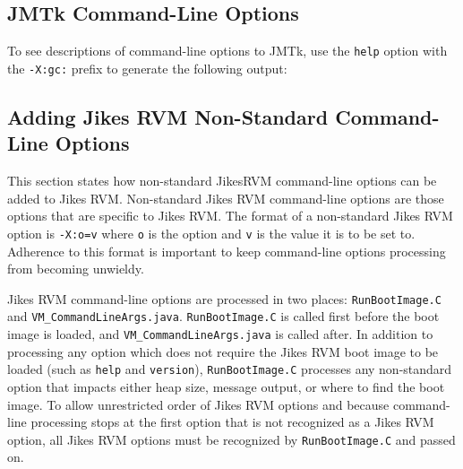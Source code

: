 \subsection{JMTk Command-Line Options}
\label{section:jmtkoptions}

To see descriptions of command-line options to JMTk,
use the {\tt help} option with the {\tt -X:gc:} prefix 
to generate the following output:

\T \begin{tiny}

\T \end{tiny}

\subsection{Adding Jikes RVM Non-Standard Command-Line Options}
This section states how non-standard Jikes\trademark RVM command-line
options can be added to Jikes RVM.  Non-standard Jikes RVM
command-line options are those options that are specific to Jikes RVM.
The format of a non-standard Jikes RVM option is {\tt -X:o=v} where
{\tt o} is the option and {\tt v} is the value it is to be set to.
Adherence to this format is important to keep command-line options
processing from becoming unwieldy.

Jikes RVM command-line options are processed in two places: 
{\tt RunBootImage.C} and {\tt VM\_CommandLineArgs.java}.  
{\tt RunBootImage.C} is called first before the boot image is loaded, and
{\tt VM\_CommandLineArgs.java} is called after.  In addition to
processing any option which does not require the Jikes RVM boot image
to be loaded (such as {\tt help} and {\tt version}), 
{\tt RunBootImage.C} processes any non-standard option that impacts either
heap size, message output, or where to find the boot image.  To allow
unrestricted order of Jikes RVM options and because command-line processing
stops at the first option that is not recognized as a Jikes RVM
option, all Jikes RVM options must be recognized by {\tt RunBootImage.C}
and passed on.

\JikesTMFooter
